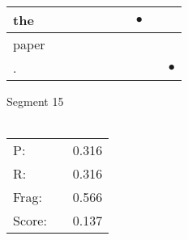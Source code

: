\documentclass[landscape]{article}
\newcommand{\ssp}{\hspace{2pt}}
\newcommand{\mex}{\cellcolor{g}$\bullet$}
\begin{document}
\begin{tabular}{|l|p{10pt}|p{10pt}|p{10pt}|p{10pt}|p{10pt}|p{10pt}|p{10pt}|p{10pt}|p{10pt}|}
\hline
\ssp \cellcolor{ref6}the \ssp&\hspace{2pt}&\hspace{2pt}&\hspace{2pt}&\hspace{2pt}&\hspace{2pt}&\hspace{2pt}&\hspace{2pt}\mex&\hspace{2pt}&\hspace{2pt}\\
\hline
\ssp paper \ssp&\hspace{2pt}&\hspace{2pt}&\hspace{2pt}&\hspace{2pt}&\hspace{2pt}&\hspace{2pt}&\hspace{2pt}&\hspace{2pt}&\hspace{2pt}\\
\hline
\ssp \cellcolor{ref8}. \ssp&\hspace{2pt}&\hspace{2pt}&\hspace{2pt}&\hspace{2pt}&\hspace{2pt}&\hspace{2pt}&\hspace{2pt}&\hspace{2pt}&\hspace{2pt}\mex\\
\hline
\end{tabular}

\vspace{6pt}
\noindent Segment 15\\\\
\noindent\begin{tabular}{lm{12pt}r}
\hline
P:&&0.316\\
R:&&0.316\\
Frag:&&0.566\\
Score:&&0.137\\
\end{tabular}

\newpage
\end{document}
